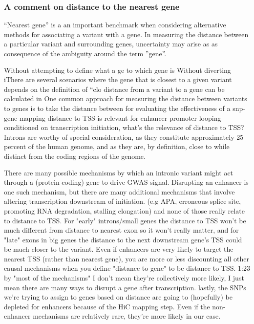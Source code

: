 \subsubsection{A comment on distance to the nearest gene}


``Nearest gene'' is a an important benchmark when considering alternative methods for associating a variant with a gene\cite{fine2019benchmarker}.  In measuring the distance between a particular variant and surrounding genes, uncertainty may arise as as consequence of the ambiguity around the term ''gene''.



Without attempting to define what a ge  to which gene is Without diverting iThere are several scenarios where the gene that is closest to a given variant depends on the definition of ``clo  distance from a variant to a gene can be calculated in One common approach for measuring the distance between variants to genes is to take the distance between        for evaluating the effectiveness of a snp-gene mapping distance to TSS is relevant for enhancer promoter looping conditioned on transcription initiation, what's the relevance of distance to TSS?
Introns are worthy of special consideration, as they constitute approximately 25 percent of the human genome, and as they are, by definition, close to while distinct from the coding regions of the genome.    

There are many possible mechanisms by which an intronic variant might act through a (protein-coding) gene to drive GWAS signal.
Disrupting an enhancer is one such mechanism, but there are many additional mechanisms that involve altering transcription downstream of initiation.   (e.g APA, erroneous splice site, promoting RNA degradation, stalling elongation) and none of those really relate to distance to TSS.    For "early" introns/small genes the distance to TSS won't be much different from distance to nearest exon so it won't really matter, and for "late" exons in big genes the distance to the next downstream gene's TSS could be much closer to the variant.   Even if enhancers are very likely to target the nearest TSS (rather than nearest gene), you are more or less discounting all other causal mechanisms when you define "distance to gene" to be distance to TSS.
1:23 by "most of the mechanisms" I don't mean they're collectively more likely, I just mean there are many ways to disrupt a gene after transcription. lastly, the SNPs we're trying to assign to genes based on distance are going to (hopefully) be depleted for enhancers because of the HiC mapping step. Even if the non-enhancer mechanisms are relatively rare, they're more likely in our case.